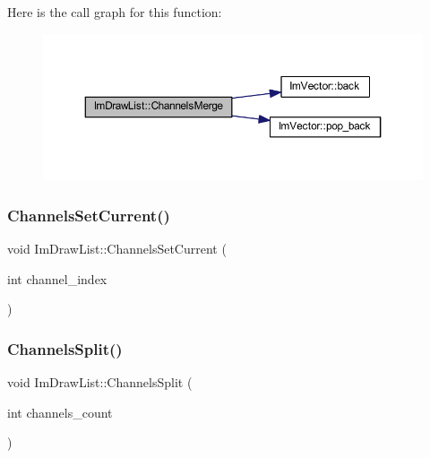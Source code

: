 Here is the call graph for this function\+:
\nopagebreak
\begin{figure}[H]
\begin{center}
\leavevmode
\includegraphics[width=350pt]{struct_im_draw_list_a2ed82c3f663cda520c90c55b94196274_cgraph}
\end{center}
\end{figure}
\mbox{\label{struct_im_draw_list_a7de44b9fdfce65f32063ecad9306a191}} 
\subsubsection{\texorpdfstring{Channels\+Set\+Current()}{ChannelsSetCurrent()}}
{\footnotesize\ttfamily void Im\+Draw\+List\+::\+Channels\+Set\+Current (\begin{DoxyParamCaption}\item[{int}]{channel\+\_\+index }\end{DoxyParamCaption})}

\mbox{\label{struct_im_draw_list_a426f124ba049bed2d38c850c65f9f917}} 
\subsubsection{\texorpdfstring{Channels\+Split()}{ChannelsSplit()}}
{\footnotesize\ttfamily void Im\+Draw\+List\+::\+Channels\+Split (\begin{DoxyParamCaption}\item[{int}]{channels\+\_\+count }\end{DoxyParamCaption})}

\mbox{\label{struct_im_draw_list_ac422590c71dc5593aea52f65793aee81}} 
